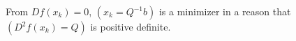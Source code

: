 \documentclass[letterpaper,12pt]{article}
\theoremstyle{definition}
\begin{document}
\begin{enumerate}
From $Df(x_k) = 0$, $(x_k=Q^{-1}b)$ is a minimizer in a reason that $(D^2f(x_k) = Q)$ is positive definite.


















\end{enumerate}

\vspace{25mm}


\end{document}
